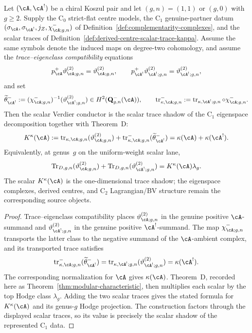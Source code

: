 \begin{proposition}
\label{prop:scalar-conductor-c1-trace-shadow}
Let \((\cA,\cA^!)\) be a chiral Koszul pair and let
\((g,n)=(1,1)\) or \((g,0)\) with \(g\geq2\).  Supply the
\(\mathrm{C}_0\) strict-flat centre models, the
\(\mathrm{C}_1\) genuine-partner datum
\((\sigma_{\cA},\sigma_{\cA^!},j_Z,\chi^-_{\cA;g,n})\) of
Definition~\ref{def:complementarity-complexes}, and the scalar traces
of Definition~\ref{def:derived-centre-scalar-trace-kappa}.  Assume the
same symbols denote the induced maps on degree-two cohomology, and
assume the \emph{trace--eigenclass compatibility} equations
\[
 p_{\cA}^{+}\vartheta_{\cA;g,n}^{(2)}
 =\vartheta_{\cA;g,n}^{(2)},
 \qquad
 p_{\cA^!}^{+}\vartheta_{\cA^!;g,n}^{(2)}
 =\vartheta_{\cA^!;g,n}^{(2)},
\]
and set
\[
 \widetilde\theta_{\cA^!}^{-}
 :=(\chi^-_{\cA;g,n})^{-1}(\vartheta_{\cA^!;g,n}^{(2)})
 \in H^2(\mathbf Q^-_{g,n}(\cA)),
 \qquad
 \operatorname{tr}^{-}_{\kappa,\cA;g,n}
 :=\operatorname{tr}_{\kappa,\cA^!;g,n}\circ\chi^-_{\cA;g,n}.
\]
Then the scalar Verdier conductor is the scalar trace shadow of the
\(\mathrm{C}_1\) eigenspace decomposition together with Theorem~D:
\[
 K^\kappa(\cA)
 :=
 \operatorname{tr}_{\kappa,\cA;g,n}(\vartheta_{\cA;g,n}^{(2)})
 +
 \operatorname{tr}^{-}_{\kappa,\cA;g,n}
   (\widetilde\theta_{\cA^!}^{-})
 =
 \kappa(\cA)+\kappa(\cA^!).
\]
Equivalently, at genus~\(g\) on the uniform-weight scalar lane,
\[
 \operatorname{Tr}_{D,g,n}(\vartheta_{\cA;g,n}^{(2)})
 +
 \operatorname{Tr}_{D,g,n}(\vartheta_{\cA^!;g,n}^{(2)})
 =
 K^\kappa(\cA)\lambda_g .
\]
The scalar \(K^\kappa(\cA)\) is the one-dimensional trace shadow;
the eigenspace complexes, derived centres, and \(\mathrm{C}_2\)
Lagrangian/BV structure remain the corresponding source objects.
\end{proposition}

\begin{proof}
Trace--eigenclass compatibility places
\(\vartheta_{\cA;g,n}^{(2)}\) in the genuine positive
\(\cA\)-summand and \(\vartheta_{\cA^!;g,n}^{(2)}\) in the genuine
positive \(\cA^!\)-summand.
The map \(\chi^-_{\cA;g,n}\) transports the latter class to the
negative summand of the \(\cA\)-ambient complex, and its transported
trace satisfies
\[
 \operatorname{tr}^{-}_{\kappa,\cA;g,n}
 (\widetilde\theta_{\cA^!}^{-})
 =\operatorname{tr}_{\kappa,\cA^!;g,n}
   (\vartheta_{\cA^!;g,n}^{(2)})
 =\kappa(\cA^!).
\]
The corresponding normalization for \(\cA\) gives \(\kappa(\cA)\).
Theorem~D,
recorded here as Theorem~\ref{thm:modular-characteristic}, then
multiplies each scalar by the top Hodge class \(\lambda_g\).  Adding
the two scalar traces gives the stated formula for \(K^\kappa(\cA)\)
and its genus-\(g\) Hodge projection.  The construction factors through
the displayed scalar traces, so its value is precisely the scalar
shadow of the represented \(\mathrm C_1\) data.
\end{proof}

